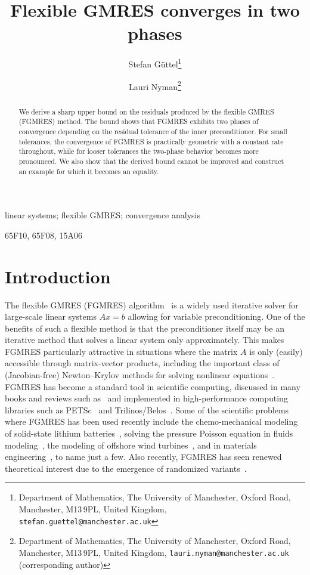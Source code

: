 \documentclass{siamart251216}
\title{Flexible GMRES converges in two phases}
\author{Stefan G\"{u}ttel\thanks{Department of Mathematics, The University of Manchester, Oxford Road, Manchester, M13\,9PL, United Kingdom, \texttt{stefan.guettel@manchester.ac.uk}}  \and
Lauri Nyman\thanks{Department of Mathematics, The University of Manchester, Oxford Road, Manchester, M13\,9PL, United Kingdom, \texttt{lauri.nyman@manchester.ac.uk} (corresponding author)}}
\begin{document}
\maketitle

\begin{abstract}
    We derive a sharp upper bound on the residuals produced by the flexible GMRES (FGMRES) method. The bound shows that FGMRES exhibits two phases of convergence depending on the residual tolerance of the inner preconditioner. For small tolerances, the convergence of FGMRES is practically geometric with a constant rate throughout, while for looser tolerances the two-phase behavior becomes more pronounced. We also show that the derived bound cannot be improved and construct an example for which it becomes an equality. 
\end{abstract}

\begin{keywords} linear systems;  flexible GMRES; convergence analysis\end{keywords}

\begin{AMS}65F10, 65F08, 15A06\end{AMS}


\pagestyle{myheadings}
\thispagestyle{plain}


\section{Introduction}
The flexible GMRES (FGMRES) algorithm~\cite{saad1993flexible} is a widely used iterative solver for large-scale linear systems $A x = b$ allowing for variable preconditioning.
One of the benefits of such a flexible method is that the preconditioner itself may be an iterative method that solves a linear system only approximately. This makes FGMRES particularly attractive in situations where the matrix $A$ is only (easily) accessible through matrix-vector products, including the important class of (Jacobian-free) Newton--Krylov methods for solving nonlinear equations~\cite{knoll2004jacobian}. \mbox{FGMRES} has become a standard tool in scientific computing, discussed in many books and reviews such as~\cite{benzi2002preconditioning,Saad2003,simoncini2007recent} and implemented in high-performance computing libraries such as PETSc~\cite{balay2019petsc} and Trilinos/Belos~\cite{bavier2012amesos2}. 
Some of the scientific problems where FGMRES has been used recently include the chemo-mechanical modeling of solid-state lithium batteries~\cite{liu2024role}, 
solving the pressure Poisson equation in fluids modeling~\cite{ge2007numerical}, the modeling of offshore wind turbines~\cite{li2022onset}, and in materials engineering~\cite{liu2018integrated}, to name just a few. Also recently, FGMRES has seen renewed theoretical interest due to the emergence of randomized variants~\cite{jang2025randomized,guttel2025stabilizing}.
\end{document}
